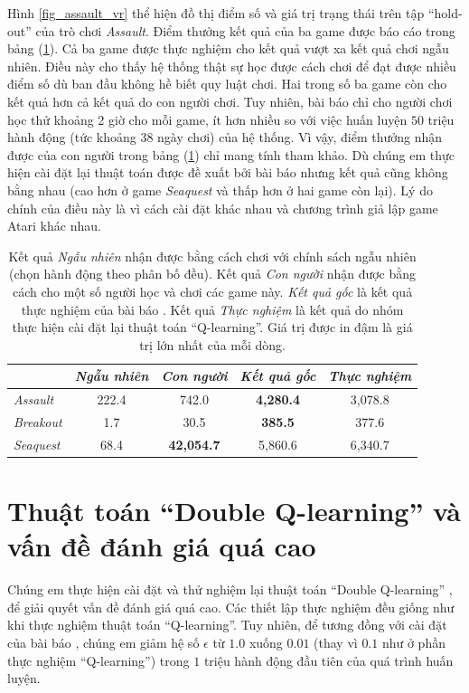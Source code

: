 	Hình \ref{fig_assault_vr} thể hiện đồ thị điểm số và giá trị trạng thái trên tập ``hold-out'' của trò chơi \textit{Assault}.
	Điểm thưởng kết quả của ba game được báo cáo trong bảng (\ref{table_dqn_results}).
	Cả ba game được thực nghiệm cho kết quả vượt xa kết quả chơi ngẫu nhiên.
	Điều này cho thấy hệ thống thật sự học được cách chơi để đạt được nhiều điểm số dù ban đầu không hề biết quy luật chơi.
	Hai trong số ba game còn cho kết quả hơn cả kết quả do con người chơi.
	Tuy nhiên, bài báo \cite{mnihdqn2015} chỉ cho người chơi học thử khoảng 2 giờ cho mỗi game, ít hơn nhiều so với việc huấn luyện $50$ triệu hành động (tức khoảng 38 ngày chơi) của hệ thống.
	Vì vậy, điểm thưởng nhận được của con người trong bảng (\ref{table_dqn_results}) chỉ mang tính tham khảo.
	Dù chúng em thực hiện cài đặt lại thuật toán được đề xuất bởi bài báo \cite{mnihdqn2015} nhưng kết quả cũng không bằng nhau (cao hơn ở game \textit{Seaquest} và thấp hơn ở hai game còn lại).
	Lý do chính của điều này là vì cách cài đặt khác nhau và chương trình giả lập game Atari khác nhau.
	
	\begin{table}
		\centering
		\caption[Điểm thưởng nhận được của thuật toán ``Q-learning'']{
		Kết quả \textit{Ngẫu nhiên} nhận được bằng cách chơi với chính sách ngẫu nhiên (chọn hành động theo phân bố đều).
		Kết quả \textit{Con người} nhận được bằng cách cho một số người học và chơi các game này.
		\textit{Kết quả gốc} là kết quả thực nghiệm của bài báo \cite{mnihdqn2015}.
		Kết quả \textit{Thực nghiệm} là kết quả do nhóm thực hiện cài đặt lại thuật toán ``Q-learning''.
		Giá trị được in đậm là giá trị lớn nhất của mỗi dòng.}
		\label{table_dqn_results}
		\begin{tabular}{| l | c | c | c | c |}
			\hline
			 & \textit{Ngẫu nhiên}\cite{mnihdqn2015} & \textit{Con người}\cite{mnihdqn2015} & \textit{Kết quả gốc}\cite{mnihdqn2015} & \textit{Thực nghiệm} \\
			\hline \hline
			\textit{Assault} & 222.4 & 742.0 & \textbf{4,280.4} & 3,078.8 \\ 
			\hline
			\textit{Breakout} & 1.7 & 30.5 & \textbf{385.5} & 377.6 \\ 
			\hline
			\textit{Seaquest} & 68.4 & \textbf{42,054.7} & 5,860.6 & 6,340.7 \\ 
			\hline
		\end{tabular}		
	\end{table}

\section{Thuật toán ``Double Q-learning'' và vấn đề đánh giá quá cao}
	Chúng em thực hiện cài đặt và thử nghiệm lại thuật toán ``Double Q-learning'' \cite{hasselt2010double}, \cite{van2015deep} để giải quyết vấn đề đánh giá quá cao.
	Các thiết lập thực nghiệm đều giống như khi thực nghiệm thuật toán ``Q-learning''.
	Tuy nhiên, để tương đồng với cài đặt của bài báo \cite{van2015deep}, chúng em giảm hệ số $\epsilon$ từ $1.0$ xuống $0.01$ (thay vì $0.1$ như ở phần thực nghiệm ``Q-learning'') trong $1$ triệu hành động đầu tiên của quá trình huấn luyện.
	

